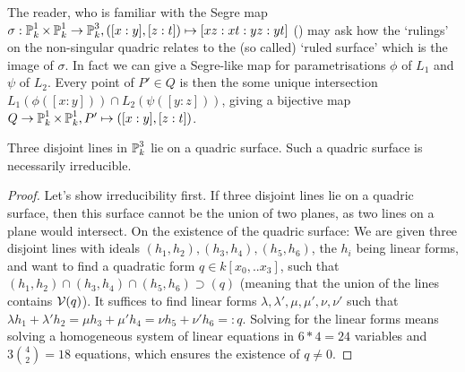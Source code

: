 \begin{remark}
The reader, who is familiar with the Segre map $\sigma : \operatorname{\mathbb P}^1_k \times \operatorname{\mathbb P}^1_k \to \operatorname{\mathbb P}^3_k, ([x:y],[z:t]) \mapsto [xz:xt:yz:yt]$ (\cite[example 2.11]{harris1992algebraic}) may ask how the `rulings' on the non-singular quadric relates to the (so called) `ruled surface' which is the image of $\sigma$.
In fact we can give a Segre-like map for parametrisations $\phi$ of $L_1$ and $\psi$ of $L_2$.
Every point of $P' \in Q$ is then the some unique intersection $L_1(\phi([x:y])) \cap L_2(\psi([y:z]))$, giving a bijective map $Q \to \operatorname{\mathbb P}^1_k \times \operatorname{\mathbb P}^1_k, P' \mapsto ([x:y],[z:t])$.
\end{remark}


\begin{lemma} \label{lemmaThreeLines}
Three disjoint lines in $\operatorname{\mathbb P}^3_k$ lie on a quadric surface.
Such a quadric surface is necessarily irreducible.
\end{lemma}
\begin{proof}
Let's show irreducibility first.
If three disjoint lines lie on a quadric surface, then this surface cannot be the union of two planes, as two lines on a plane would intersect.
On the existence of the quadric surface:
We are given three disjoint lines with ideals $(h_1,h_2), (h_3,h_4), (h_5,h_6)$, the $h_i$ being linear forms, and want to find a quadratic form $q \in k[x_0,..x_3]$, such that $(h_1,h_2) \cap (h_3,h_4) \cap (h_5,h_6) \supset (q)$ (meaning that the union of the lines contains $\operatorname{\mathcal V}(q)$).
It suffices to find linear forms $\lambda,\lambda',\mu,\mu',\nu,\nu'$ such that
$\lambda h_1 + \lambda' h_2 = \mu h_3 + \mu' h_4 = \nu h_5 + \nu' h_6 =: q$.
Solving for the linear forms means solving a homogeneous system of linear equations in $6*4= 24$ variables and $3\binom{4}{2} = 18$ equations, which ensures the existence of $q \neq 0$.
\end{proof}
